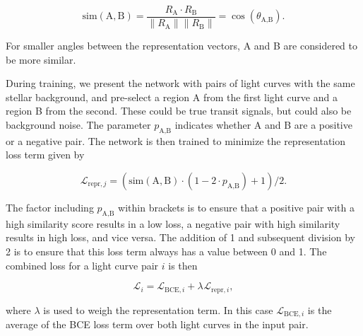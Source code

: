 \begin{equation}
    \text{sim}(\text{A}, \text{B})  = \frac{R_\text{A} \cdot R_\text{B}}{\|R_\text{A}\|\|R_\text{B}\|} = \cos(\theta_{\text{A}, \text{B}}).
\end{equation}

\noindent For smaller angles between the representation vectors, A and B are considered to be more similar. 

During training, we present the network with pairs of light curves with the same stellar background, and pre-select a region A from the first light curve and a region B from the second. These could be true transit signals, but could also be background noise. The parameter $p_{\text{A},\text{B}}$ indicates whether A and B are a positive or a negative pair. The network is then trained to minimize the representation loss term given by

\begin{equation}
   \mathcal{L}_{\text{repr}, j} =(\text{sim}(\text{A}, \text{B}) \cdot(1 - 2 \cdot p_{\text{A},\text{B}}) + 1) / 2.
\end{equation}

\noindent The factor including $p_{\text{A},\text{B}}$ within brackets is to ensure that a positive pair with a high similarity score results in a low loss, a negative pair with high similarity results in high loss, and vice versa. The addition of 1 and subsequent division by 2 is to ensure that this loss term always has a value between 0 and 1. The combined loss for a light curve pair $i$ is then 

\begin{equation}
    \mathcal{L}_{i} = \mathcal{L}_{\text{BCE}, i} + \lambda_{} \mathcal{L}_{\text{repr}, i},
\end{equation}

\noindent where $\lambda$ is used to weigh the representation term. In this case $\mathcal{L}_{\text{BCE}, i}$ is the average of the BCE loss term over both light curves in the input pair.
